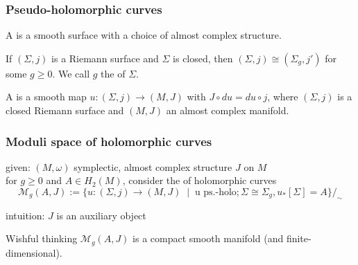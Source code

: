 \begin{frame}
  \frametitle{Pseudo-holomorphic curves}
  \begin{definition}
    A  is a smooth surface with a choice of almost complex structure.
  \end{definition}
  \begin{fact}
    If $(\Sigma,j)$ is a Riemann surface and $\Sigma$ is closed, then $(\Sigma,j)\cong (\Sigma_g,j')$ for some $g\geq 0$. We call $g$ the  of $\Sigma$.
  \end{fact}
  \begin{definition}
    A   is a smooth map $u\colon (\Sigma,j)\to (M,J)$ with $J\circ du=du\circ j$,
    where $(\Sigma,j)$ is a closed Riemann surface and $(M,J)$ an almost complex manifold.
  \end{definition}
\end{frame}

\begin{frame}
  \frametitle{Moduli space of holomorphic curves}

  given: $(M,\omega)$ symplectic, almost complex structure $J$ on $M$\\
  for $g\geq 0$ and $A\in H_2(M)$, consider the  of holomorphic curves
  \[ \mathcal{M}_g(A,J) := \{ u\colon (\Sigma,j)\to (M,J)\;\mid\; \text{u ps.-holo}; \Sigma\cong\Sigma_g, u_*[\Sigma]=A \}/_\sim \]

  intuition: $J$ is an auxiliary object
  \begin{block}{Wishful thinking}
    $\mathcal{M}_g(A,J)$ is a compact smooth manifold (and finite-dimensional).
  \end{block}
\end{frame}

